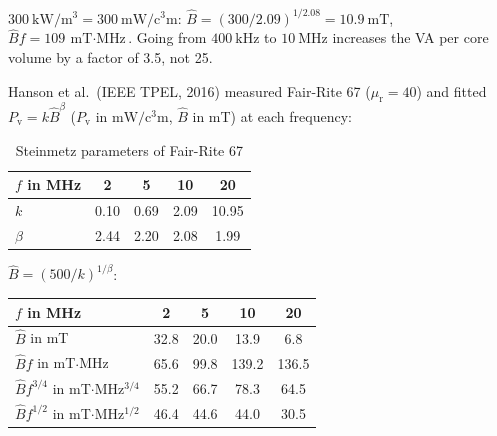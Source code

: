
\begin{solutionblock}
	$\SI{300}{\kilo\watt\per\cubic\metre}=\SI{300}{\milli\watt\per\cubic\centi\metre}$: $\hat{B}=(300/2.09)^{1/2.08}=\SI{10.9}{\milli\tesla}$, $\hat{B}f=\SI{109}{\milli\tesla\cdot\mega\hertz}$. Going from $\SI{400}{\kilo\hertz}$ to $\SI{10}{\mega\hertz}$ increases the VA per core volume by a factor of 3.5, not 25.
\end{solutionblock}



Hanson et al.\ (IEEE TPEL, 2016) measured Fair-Rite 67 ($\mu_\mathrm{r}=40$) and fitted $P_\mathrm{v}=k\hat{B}^{\beta}$ ($P_\mathrm{v}$ in $\si{\milli\watt\per\cubic\centi\metre}$, $\hat{B}$ in mT) at each frequency:

\begin{table}[ht]
	\centering
	\begin{tabular}{|l|c|c|c|c|}
		\hline
		$f$ in MHz & 2    & 5    & 10   & 20    \\
		\hline
		$k$        & 0.10 & 0.69 & 2.09 & 10.95 \\
		$\beta$    & 2.44 & 2.20 & 2.08 & 1.99  \\
		\hline
	\end{tabular}
	\caption{Steinmetz parameters of Fair-Rite 67}
	\label{tab:ex06_fr67}
\end{table}


\begin{solutionblock}
	$\hat{B}=(500/k)^{1/\beta}$:
	\begin{solutiontable}[ht]
		\centering
		\begin{tabular}{|l|c|c|c|c|}
			\hline
			$f$ in MHz                                      & 2    & 5    & 10    & 20    \\
			\hline
			$\hat{B}$ in mT                                 & 32.8 & 20.0 & 13.9  & 6.8   \\
			$\hat{B}f$ in mT$\cdot$MHz                       & 65.6 & 99.8 & 139.2 & 136.5 \\
			$\hat{B}f^{3/4}$ in mT$\cdot$MHz$^{3/4}$         & 55.2 & 66.7 & 78.3  & 64.5  \\
			$\hat{B}f^{1/2}$ in mT$\cdot$MHz$^{1/2}$         & 46.4 & 44.6 & 44.0  & 30.5  \\
			\hline
		\end{tabular}
	\end{solutiontable}
\end{solutionblock}


